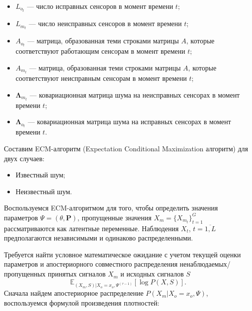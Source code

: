 \documentclass[11pt]{article}
\newcommand{\Expect}{\mathbb{E}}
\begin{document}
\begin{itemize}
\item
$L_{o_t}$ --- число исправных сенсоров в момент времени $t$;
\item
 $L_{m_t}$ --- число неисправных сенсоров в момент времени $t$;
\item 
$A_{o_t}$ --- матрица, образованная теми строками матрицы $A$, которые соответствуют работающим сенсорам в момент времени $t$; 
\item
$A_{m_t}$ --- матрица, образованная теми строками матрицы $A$, которые соответствуют неисправным сенсорам в момент времени $t$;
\item
$\mathbf{\Lambda}_{m_t}$ --- ковариационная матрица шума на неисправных сенсорах в момент времени $t$;
\item 
 $\mathbf{\Lambda}_{o_t}$ --- ковариационная матрица шума на исправных сенсорах в момент времени $t$.
\end{itemize}
Составим ECM-алгоритм (Expectation Conditional Maximization алгоритм) для двух случаев:
\begin{itemize}
\item
Известный шум;
\item
Неизвестный шум.
\end{itemize}
\clearpage
\begin{center}
\fontsize{16}{20}\selectfont {}
\end{center}
Воспользуемся ECM-алгоритмом для того, чтобы определить значения параметров $\Psi = (\theta, \mathbf{P})$, пропущенные значения $X_m=\{X_{m_t}\}_{t=1}^G$ рассматриваются как латентные переменные. Наблюдения $X_t$, $t=\overline{1,L}$ предполагаются независимыми и одинаково распределенными.
\begin{center}
\fontsize{14}{18}\selectfont {}
\end{center}
\begin{center}
\fontsize{14}{18}\selectfont {}
\end{center}
Требуется найти условное математическое ожидание с учетом  текущей оценки параметров и апостериорного совместного распределения ненаблюдаемых/пропущенных принятых сигналов $X_m$ и исходных сигналов $S$ 
\begin{equation}
 \Expect_{(X_m,S)|X_o=x_o, \Psi^{(\tau-1)}}[\log P(X, S)].
\end{equation}
Сначала найдем апостериорное распределение $P(X_m|X_o=x_o,\Psi)$, воспользуемся формулой произведения плотностей:
\end{document}
